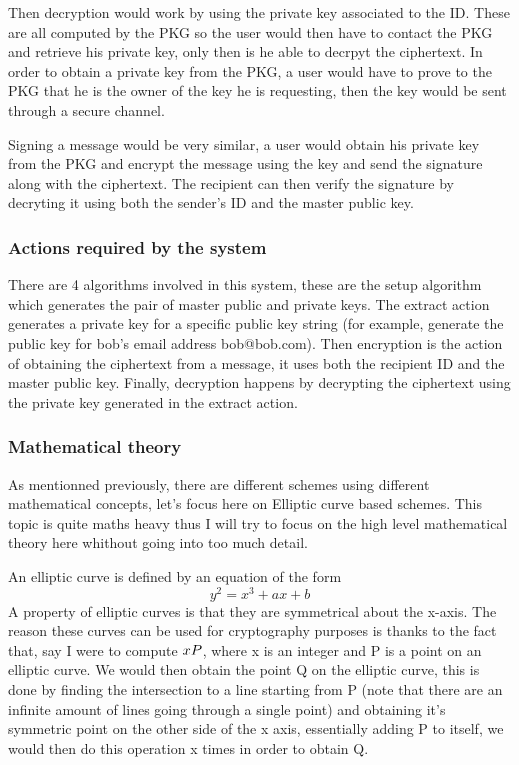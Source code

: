 \documentclass[conference]{IEEEtran}
\begin{document}
Then decryption would work by using the private key associated to the ID. These are all 
computed by the PKG so the user would then have to contact the PKG and retrieve his private key,
only then is he able to decrpyt the ciphertext. In order to obtain a private key from the PKG, a user 
would have to prove to the PKG that he is the owner of the key he is requesting, then the key would be sent 
through a secure channel.


Signing a message would be very similar, a user would obtain his private key from the PKG
and encrypt the message using the key and send the signature along with the ciphertext.
The recipient can then verify the signature by decryting it using both the sender's ID and the 
master public key.


\subsubsection{Actions required by the system}
There are 4 algorithms involved in this system, these are
the setup algorithm which generates the pair of master public and private
keys. The extract action generates a private key for a specific public key string (for example,
generate the public key for bob's email address bob@bob.com).
Then encryption is the action of obtaining the ciphertext from a message, it uses both the 
recipient ID and the master public key. Finally, decryption happens by decrypting the ciphertext 
using the private key generated in the extract action.


\subsubsection{Mathematical theory}
As mentionned previously, there are different schemes using different mathematical concepts,
let's focus here on Elliptic curve based schemes. This topic is quite maths heavy thus 
I will try to focus on the high level mathematical theory here whithout 
going into too much detail.


An elliptic curve is defined by an equation of the form 
\begin{equation*}
    y^2 = x^3 + ax + b
\end{equation*}
A property of elliptic curves is that they are symmetrical about the x-axis. The reason these
curves can be used for cryptography purposes is thanks to the fact that, say I were to compute 
$x\*P$, where x is an integer and P is a point on an elliptic curve. We would then obtain the point Q on the 
elliptic curve, this is done by finding the intersection to a line starting from P 
(note that there are an infinite amount of lines going through a single point) and obtaining it's 
symmetric point on the other side of the x axis, essentially adding P to itself, we would then do this 
operation x times in order to obtain Q.
\end{document}

